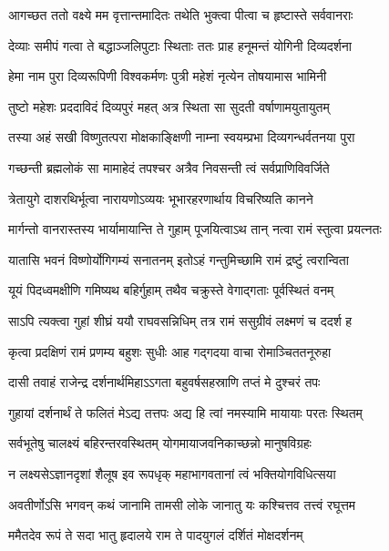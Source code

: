 \twolineshloka
{आगच्छत ततो वक्ष्ये मम वृत्तान्तमादितः}
{तथेति भुक्त्वा पीत्वा च हृष्टास्ते सर्ववानराः} %

\twolineshloka
{देव्याः समीपं गत्वा ते बद्धाञ्जलिपुटाः स्थिताः}
{ततः प्राह हनूमन्तं योगिनी दिव्यदर्शना} %

\twolineshloka
{हेमा नाम पुरा दिव्यरूपिणी विश्वकर्मणः}
{पुत्री महेशं नृत्येन तोषयामास भामिनी} %

\twolineshloka
{तुष्टो महेशः प्रददाविदं दिव्यपुरं महत्}
{अत्र स्थिता सा सुदती वर्षाणामयुतायुतम्} %

\twolineshloka
{तस्या अहं सखी विष्णुतत्परा मोक्षकाङ्क्षिणी}
{नाम्ना स्वयम्प्रभा दिव्यगन्धर्वतनया पुरा} %

\twolineshloka
{गच्छन्ती ब्रह्मलोकं सा मामाहेदं तपश्चर}
{अत्रैव निवसन्ती त्वं सर्वप्राणिविवर्जिते} %

\twolineshloka
{त्रेतायुगे दाशरथिर्भूत्वा नारायणोऽव्ययः}
{भूभारहरणार्थाय विचरिष्यति कानने} %

\twolineshloka
{मार्गन्तो वानरास्तस्य भार्यामायान्ति ते गुहाम्}
{पूजयित्वाऽथ तान् नत्वा रामं स्तुत्वा प्रयत्नतः} %

\twolineshloka
{यातासि भवनं विष्णोर्योगिगम्यं सनातनम्}
{इतोऽहं गन्तुमिच्छामि रामं द्रष्टुं त्वरान्विता} %

\twolineshloka
{यूयं पिदध्वमक्षीणि गमिष्यथ बहिर्गुहाम्}
{तथैव चक्रुस्ते वेगाद्गताः पूर्वस्थितं वनम्} %

\twolineshloka
{साऽपि त्यक्त्वा गुहां शीघ्रं ययौ राघवसन्निधिम्}
{तत्र रामं ससुग्रीवं लक्ष्मणं च ददर्श ह} %

\twolineshloka
{कृत्वा प्रदक्षिणं रामं प्रणम्य बहुशः सुधीः}
{आह गद्गदया वाचा रोमाञ्चिततनूरुहा} %

\twolineshloka
{दासी तवाहं राजेन्द्र दर्शनार्थमिहाऽऽगता}
{बहुवर्षसहस्राणि तप्तं मे दुश्चरं तपः} %

\twolineshloka
{गुहायां दर्शनार्थं ते फलितं मेऽद्य तत्तपः}
{अद्य हि त्वां नमस्यामि मायायाः परतः स्थितम्} %

\twolineshloka
{सर्वभूतेषु चालक्ष्यं बहिरन्तरवस्थितम्}
{योगमायाजवनिकाच्छन्नो मानुषविग्रहः} %

\twolineshloka
{न लक्ष्यसेऽज्ञानदृशां शैलूष इव रूपधृक्}
{महाभागवतानां त्वं भक्तियोगविधित्सया} %

\twolineshloka
{अवतीर्णोऽसि भगवन् कथं जानामि तामसी}
{लोके जानातु यः कश्चित्तव तत्त्वं रघूत्तम} %

\twolineshloka
{ममैतदेव रूपं ते सदा भातु हृदालये}
{राम ते पादयुगलं दर्शितं मोक्षदर्शनम्} %

